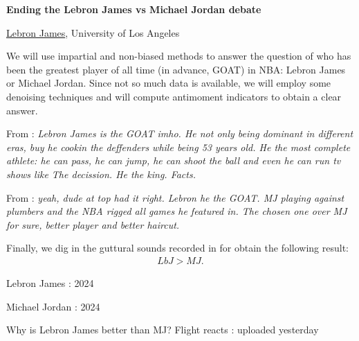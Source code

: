 \documentclass[a4paper, 11pt]{article}
\newcommand{\abstracttitle}[1]{{
    \centering
    \LARGE \textbf{#1}\\
    \vspace*{0.7cm}
}}
\newcommand{\firstauthor}[2]{{
    \centering
    \underline{#1}, \textsf{#2}\\
    \vspace*{0.25cm}
}}
\newcommand{\abstracttext}[1]{
    \vspace{0.6cm}
    #1
}
\begin{document}
\abstracttitle{Ending the Lebron James vs Michael Jordan debate}

\firstauthor{Lebron James}{University of Los Angeles}

\abstracttext{
    We will use impartial and non-biased methods to answer the question of who has been the greatest player of all time (in advance, GOAT) in NBA: Lebron James or Michael Jordan. Since not so much data is available, we will employ some denoising techniques and will compute antimoment indicators to obtain a clear answer.

    From \cite{lebron james}: \textit{Lebron James is the GOAT imho. He not only being dominant in different eras, buy he cookin the deffenders while being 53 years old. He the most complete athlete: he can pass, he can jump, he can shoot the ball and even he can run tv shows like The decission. He the king. Facts.}

    From \cite{mj}: \textit{yeah, dude at top had it right. Lebron he the GOAT. MJ playing against plumbers and the NBA rigged all games he featured in. The chosen one over MJ for sure, better player and better haircut.}

    Finally, we dig in the guttural sounds recorded in \cite{youtube} for obtain the following result:
    \begin{align}
        LbJ > MJ.
    \end{align}
}

\begin{thebibliography}{9}
\newblock Lebron James
: 2024

\newblock Michael Jordan
: 2024

\newblock Why is Lebron James better than MJ? Flight reacts
: uploaded yesterday
\end{thebibliography}
\end{document}
